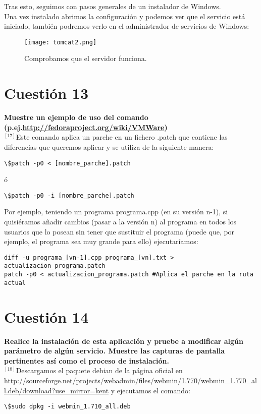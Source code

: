 \documentclass[a4paper, 11pt]{article} %
\begin{document}
Tras esto, seguimos con pasos generales de un instalador de Windows.\\
Una vez instalado abrimos la configuración y podemos ver que el servicio está iniciado, también podremos verlo en el administrador de servicios de Windows:

\begin{figure}[h]
\centering 
\texttt{[image: tomcat2.png]} 
\caption{Comprobamos que el servidor funciona.} 
\vspace{-0.5cm}
\label{contexto:figura} 
\end{figure}

\pagebreak

\section{Cuestión 13}
\textbf{Muestre un ejemplo de uso del comando (p.ej.\url{http://fedoraproject.org/wiki/VMWare})}\\

$^{[17]}$Este comando aplica un parche en un fichero .patch que contiene las diferencias que queremos aplicar y se utiliza de la siguiente manera:
\begin{verbatim}
\$patch -p0 < [nombre_parche].patch
\end{verbatim}
ó
\begin{verbatim}
\$patch -p0 -i [nombre_parche].patch
\end{verbatim}

Por ejemplo, teniendo un programa programa.cpp (en su versión n-1), si quisiéramos añadir cambios (pasar a la versión n) al programa en todos los usuarios que lo posean sin tener que sustituir el programa (puede que, por ejemplo, el programa sea muy grande para ello) ejecutaríamos:
\begin{verbatim}
diff -u programa_[vn-1].cpp programa_[vn].txt > actualizacion_programa.patch
patch -p0 < actualizacion_programa.patch #Aplica el parche en la ruta actual
\end{verbatim}

\section{Cuestión 14}
\textbf{Realice la instalación de esta aplicación y pruebe a modificar algún parámetro de algún servicio. Muestre las capturas de pantalla pertinentes así como el proceso de instalación.}\\

$^{[18]}$Descargamos el paquete debian de la página oficial en \url{http://sourceforge.net/projects/webadmin/files/webmin/1.770/webmin_1.770_all.deb/download?use_mirror=kent}
y ejecutamos el comando:
\begin{verbatim}
\$sudo dpkg -i webmin_1.710_all.deb
\end{verbatim}
\end{document}
